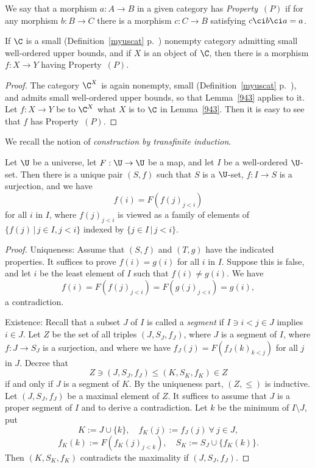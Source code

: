 \documentclass[12pt]{article}
\theoremstyle{remark}
\theoremstyle{definition}
\begin{document}
\begin{df}[Property~$(P)$] 
We say that a morphism $a:A\to B$ in a given category has \emph{Property}~$(P)$ if for any morphism $b:B\to C$ there is a morphism $c:C\to B$ satisfying $c\ci b\ci a=a$.  
\end{df}  

\begin{lem}[Sublemma 9.4.4 p. 229] 
If $\C$ is a small (Definition~\ref{myuscat} p.~) nonempty category admitting small well-ordered upper bounds, and if $X$ is an object of $\C$, then there is a morphism $f:X\to Y$ having Property~$(P)$.
\end{lem}

\begin{proof}
The category $\C^X$ is again nonempty, small (Definition~\ref{myuscat} p.~), and admits small well-ordered upper bounds, so that Lemma~\ref{943} applies to it. Let $f:X\to Y$ be to $\C^X$ what $X$ is to $\C$ in Lemma~\ref{943}. Then it is easy to see that $f$ has Property~$(P)$. 
\end{proof}

We recall the notion of {\em construction by transfinite induction}. 

\begin{thm} 
Let $\U$ be a universe, let $F:\U\to\U$ be a map, and let $I$ be a well-ordered $\U$-set. Then there is a unique pair $(S,f)$ such that $S$ is a $\U$-set, $f:I\to S$ is a surjection, and we have 
$$
f(i)=F(f(j)_{j<i})
$$ 
for all $i$ in $I$, where $f(j)_{j<i}$ is viewed as a family of elements of $\{f(j)\,|\,j\in I,j<i\}$ indexed by $\{j\in I\,|\,j<i\}$. %
\end{thm}

\begin{proof}
Uniqueness: Assume that $(S,f)$ and $(T,g)$ have the indicated properties. It suffices to prove $f(i)=g(i)$ for all $i$ in $I$. Suppose this is false, and let $i$ be the least element of $I$ such that $f(i)\neq g(i)$. We have 
$$
f(i)=F(f(j)_{j<i})=F(g(j)_{j<i})=g(i),
$$ 
a contradiction. 

Existence: Recall that a subset $J$ of $I$ is called a {\em segment} if $I\ni i<j\in J$ implies $i\in J$. Let $Z$ be the set of all triples $(J,S_J,f_J)$, where $J$ is a segment of $I$, where $f:J\to S_J$ is a surjection, and where we have $f_J(j)=F(f_J(k)_{k<j})$ for all $j$ in $J$. Decree that 
$$
Z\ni(J,S_J,f_J)\le(K,S_K,f_K)\in Z
$$ 
if and only if $J$ is a segment of $K$. By the uniqueness part, $(Z,\le)$ is inductive. Let $(J,S_J,f_J)$ be a maximal element of $Z$. It suffices to assume that $J$ is a proper segment of $I$ and to derive a contradiction. Let $k$ be the minimum of $I\setminus J$, put 
$$
K:=J\cup\{k\},\quad f_K(j):=f_J(j)\ \forall\ j\in J,
$$
$$
f_K(k):=F(f_K(j)_{j<k}),\quad S_K:=S_J\cup\{f_K(k)\}.
$$ 
Then $(K,S_K,f_K)$ contradicts the maximality if $(J,S_J,f_J)$. 
\end{proof}
\end{document}
